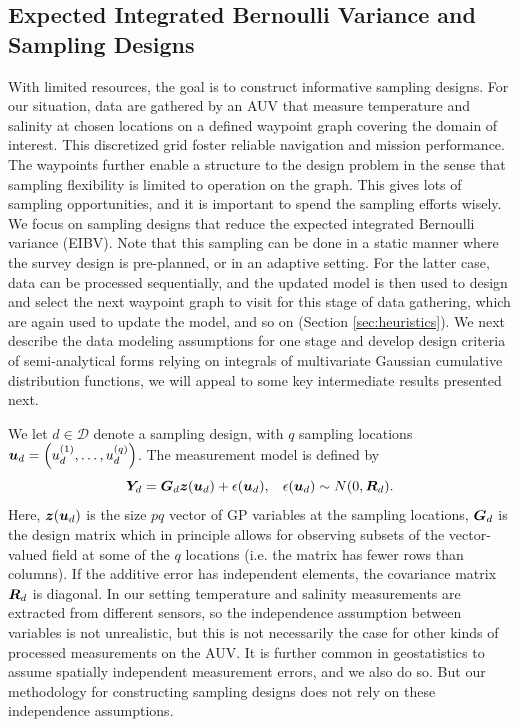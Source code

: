 \documentclass[aoas]{imsart}
\begin{document}
\subsection{Expected Integrated Bernoulli Variance and Sampling Designs}

With limited resources, the goal is to construct informative sampling designs. For our situation, data are gathered by an AUV that measure temperature and salinity at chosen locations on a defined waypoint graph covering the domain of interest. This discretized grid foster reliable navigation and mission performance. The waypoints further enable a structure to the design problem in the sense that sampling flexibility is limited to operation on the graph. This gives lots of sampling opportunities, and it is important to spend the sampling efforts wisely. We focus on sampling designs that reduce the expected integrated Bernoulli variance (EIBV). Note that this sampling can be done in a static manner where the survey design is pre-planned, or in an adaptive setting. For the latter case, data can be processed sequentially, and the updated model is then used to design and select the
next waypoint graph to visit for this stage of data gathering, which are again used to update the model, and so on (Section
\ref{sec:heuristics}). We next describe the data modeling assumptions for one stage and develop design criteria of semi-analytical forms relying on integrals of multivariate Gaussian cumulative distribution functions, we will appeal to some key intermediate results presented next. 

We let $d \in \mathcal{D}$ denote a sampling design, with $q$ sampling locations ${\boldsymbol u}_d=\left(u_d^{(1)},\ldots, u_d^{(q)}\right)$. The measurement model is defined by
\begin{equation}\label{eq:meas}
    \bY_d=\bG_d \bz(\bu_d) + \epsilon(\bu_d), \hspace{3mm} \epsilon(\bu_d) \sim N(0,\bR_d).
\end{equation}
Here, ${\boldsymbol z}({\boldsymbol u}_d)$ is the size $pq$ vector of GP variables at the sampling locations, ${\boldsymbol G}_d$ is the design matrix which in principle allows for observing subsets of the vector-valued field at some of the $q$ locations (i.e. the matrix has fewer rows than columns). If the additive error has independent elements, the covariance matrix ${\boldsymbol R}_d$ is diagonal. In our setting temperature and salinity measurements are extracted from different sensors, so the independence assumption between variables is not unrealistic, but this is not necessarily the case for other kinds of processed measurements on the AUV. It is further common in geostatistics to assume spatially independent measurement errors, and we also do so. But our methodology for constructing sampling designs does not rely on these independence assumptions. 
\end{document}
